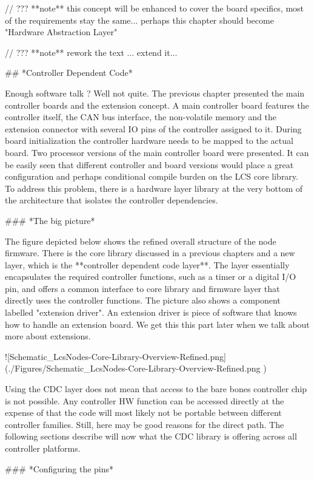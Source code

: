 
// ??? **note** this concept will be enhanced to cover the board specifics, most of the requirements stay the same... perhaps this chapter should become "Hardware Abstraction Layer"

// ??? **note** rework the text ... extend it...

## *Controller Dependent Code*

Enough software talk ? Well not quite. The previous chapter presented the main controller boards and the extension concept. A main controller board features the controller itself, the CAN bus interface, the non-volatile memory and the extension connector with several IO pins of the controller assigned to it. During board initialization the controller hardware needs to be mapped to the actual board. Two processor versions of the main controller board were presented. It can be easily seen that different controller and board versions would place a great configuration and perhaps conditional compile burden on the LCS core library. To address this problem, there is a hardware layer library at the very bottom of the architecture that isolates the controller dependencies.

### *The big picture*

The figure depicted below shows the refined overall structure of the node firmware. There is the core library discussed in a previous chapters and a new layer, which is the **controller dependent code layer**. The layer essentially encapsulates the required controller functions, such as a timer or a digital I/O pin, and offers a common interface to core library and firmware layer that directly uses the controller functions. The picture also shows a component labelled "extension driver". An extension driver is piece of software that knows how to handle an extension board. We get this this part later when we talk about more about extensions.

![Schematic_LcsNodes-Core-Library-Overview-Refined.png](./Figures/Schematic_LcsNodes-Core-Library-Overview-Refined.png )

Using the CDC layer does not mean that access to the bare bones controller chip is not possible. Any controller HW function can be accessed directly at the expense of that the code will most likely not be portable between different controller families. Still, here may be good reasons for the direct path. The following sections describe will now what the CDC library is offering across all controller platforms.

### *Configuring the pins*

